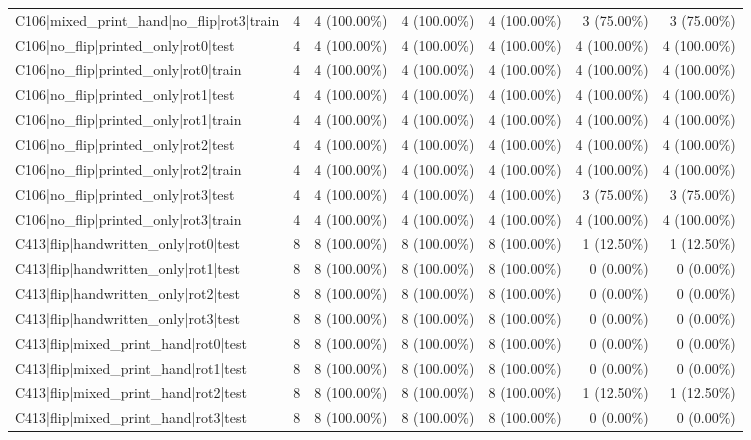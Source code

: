 \begin{longtable}{>{\raggedright\arraybackslash}p{5cm}rrrrrr}
C106|mixed\_print\_hand|no\_flip|rot3|train & 4 & 4 (100.00\%) & 4 (100.00\%) & 4 (100.00\%) & 3 (75.00\%) & 3 (75.00\%) \\
C106|no\_flip|printed\_only|rot0|test & 4 & 4 (100.00\%) & 4 (100.00\%) & 4 (100.00\%) & 4 (100.00\%) & 4 (100.00\%) \\
C106|no\_flip|printed\_only|rot0|train & 4 & 4 (100.00\%) & 4 (100.00\%) & 4 (100.00\%) & 4 (100.00\%) & 4 (100.00\%) \\
C106|no\_flip|printed\_only|rot1|test & 4 & 4 (100.00\%) & 4 (100.00\%) & 4 (100.00\%) & 4 (100.00\%) & 4 (100.00\%) \\
C106|no\_flip|printed\_only|rot1|train & 4 & 4 (100.00\%) & 4 (100.00\%) & 4 (100.00\%) & 4 (100.00\%) & 4 (100.00\%) \\
C106|no\_flip|printed\_only|rot2|test & 4 & 4 (100.00\%) & 4 (100.00\%) & 4 (100.00\%) & 4 (100.00\%) & 4 (100.00\%) \\
C106|no\_flip|printed\_only|rot2|train & 4 & 4 (100.00\%) & 4 (100.00\%) & 4 (100.00\%) & 4 (100.00\%) & 4 (100.00\%) \\
C106|no\_flip|printed\_only|rot3|test & 4 & 4 (100.00\%) & 4 (100.00\%) & 4 (100.00\%) & 3 (75.00\%) & 3 (75.00\%) \\
C106|no\_flip|printed\_only|rot3|train & 4 & 4 (100.00\%) & 4 (100.00\%) & 4 (100.00\%) & 4 (100.00\%) & 4 (100.00\%) \\
C413|flip|handwritten\_only|rot0|test & 8 & 8 (100.00\%) & 8 (100.00\%) & 8 (100.00\%) & 1 (12.50\%) & 1 (12.50\%) \\
C413|flip|handwritten\_only|rot1|test & 8 & 8 (100.00\%) & 8 (100.00\%) & 8 (100.00\%) & 0 (0.00\%) & 0 (0.00\%) \\
C413|flip|handwritten\_only|rot2|test & 8 & 8 (100.00\%) & 8 (100.00\%) & 8 (100.00\%) & 0 (0.00\%) & 0 (0.00\%) \\
C413|flip|handwritten\_only|rot3|test & 8 & 8 (100.00\%) & 8 (100.00\%) & 8 (100.00\%) & 0 (0.00\%) & 0 (0.00\%) \\
C413|flip|mixed\_print\_hand|rot0|test & 8 & 8 (100.00\%) & 8 (100.00\%) & 8 (100.00\%) & 0 (0.00\%) & 0 (0.00\%) \\
C413|flip|mixed\_print\_hand|rot1|test & 8 & 8 (100.00\%) & 8 (100.00\%) & 8 (100.00\%) & 0 (0.00\%) & 0 (0.00\%) \\
C413|flip|mixed\_print\_hand|rot2|test & 8 & 8 (100.00\%) & 8 (100.00\%) & 8 (100.00\%) & 1 (12.50\%) & 1 (12.50\%) \\
C413|flip|mixed\_print\_hand|rot3|test & 8 & 8 (100.00\%) & 8 (100.00\%) & 8 (100.00\%) & 0 (0.00\%) & 0 (0.00\%) \\

\end{longtable}
